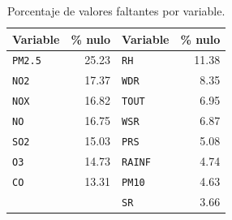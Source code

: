 \begin{table}[pos=t]
  \centering
  \caption{Porcentaje de valores faltantes por variable.}
  \label{tab:dic-faltantes}
  \small
  \begin{tabular}{lr@{\qquad}lr}
    \toprule
    Variable & \% nulo & Variable & \% nulo \\
    \midrule
    \texttt{PM2.5} & 25.23 & \texttt{RH}    & 11.38 \\
    \texttt{NO2}   & 17.37 & \texttt{WDR}   & 8.35  \\
    \texttt{NOX}   & 16.82 & \texttt{TOUT}  & 6.95  \\
    \texttt{NO}    & 16.75 & \texttt{WSR}   & 6.87  \\
    \texttt{SO2}   & 15.03 & \texttt{PRS}   & 5.08  \\
    \texttt{O3}    & 14.73 & \texttt{RAINF} & 4.74  \\
    \texttt{CO}    & 13.31 & \texttt{PM10}  & 4.63  \\
                   &       & \texttt{SR}    & 3.66  \\
    \bottomrule
  \end{tabular}
\end{table}


